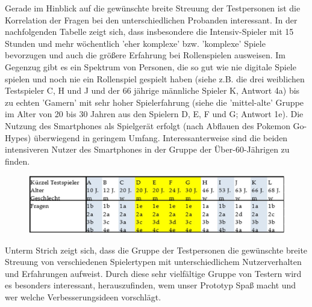 \documentclass[extern,palatino]{cgBA}
\begin{document}
Gerade im Hinblick auf die gewünschte breite Streuung der Testpersonen ist die Korrelation der Fragen bei den unterschiedlichen Probanden interessant. In der nachfolgenden Tabelle zeigt sich, dass insbesondere die Intensiv-Spieler mit 15 Stunden und mehr wöchentlich 'eher komplexe' bzw. 'komplexe' Spiele bevorzugen und auch die größere Erfahrung bei Rollenspielen ausweisen.  Im Gegenzug gibt es ein Spektrum von Personen, die so gut wie nie digitale Spiele spielen und noch nie ein Rollenspiel gespielt haben (siehe z.B. die drei weiblichen Testspieler C, H und J und der 66 jährige männliche Spieler K, Antwort 4a) bis zu echten 'Gamern' mit sehr hoher Spielerfahrung (siehe die 'mittel-alte' Gruppe im Alter von 20 bis 30 Jahren aus den Spielern D, E, F und G; Antwort 1e). Die Nutzung des Smartphones als Spielgerät erfolgt (nach Abflauen des Pokemon Go-Hypes) überwiegend in geringem Umfang. Interessanterweise sind die beiden intensiveren Nutzer des Smartphones in der Gruppe der Über-60-Jährigen zu finden.
\begin{figure}[H]
	\centering
	\includegraphics[width=1\textwidth]{testspieler.jpg}
\end{figure} 
Unterm Strich zeigt sich, dass die Gruppe der Testpersonen die gewünschte breite Streuung von verschiedenen Spielertypen mit unterschiedlichem Nutzerverhalten und Erfahrungen aufweist.  Durch diese sehr vielfältige Gruppe von Testern wird es besonders interessant, herauszufinden, wem unser Prototyp Spaß macht und wer welche Verbesserungsideen vorschlägt.
\newpage
\end{document}
